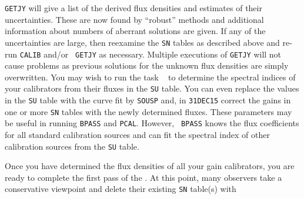       {\tt GETJY} will give a list of the derived flux densities and
estimates of their uncertainties.  These are now found by ``robust''
methods and additional information about numbers of aberrant solutions
are given.  If any of the uncertainties are large, then reexamine the
{\tt SN} tables as described above and re-run {\tt CALIB} and/or {\tt
GETJY} as necessary.  Multiple executions of {\tt GETJY} will not
cause problems as previous solutions for the unknown flux densities
are simply overwritten.  You may wish to run the task {\tt
{}} to determine the spectral indices of your calibrators
from their fluxes in the {\tt SU} table.  You can even replace the
values in the {\tt SU} table with the curve fit by {\tt SOUSP} and, in
{\tt 31DEC15} correct the gains in one or more {\tt SN} tables with
the newly determined fluxes.  These  parameters
may be useful in running {\tt BPASS} and {\tt PCAL}\@.  However, {\tt
BPASS} knows the flux coefficients for all standard calibration
sources and can fit the spectral index of other calibration sources
from the {\tt SU} table.


     Once you have determined the flux densities of all your gain
calibrators, you are ready to complete the first pass of the
.  At this point, many observers take a conservative
viewpoint and delete their existing {\tt SN} table(s) with

